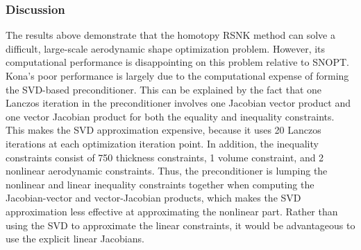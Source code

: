 \subsubsection{Discussion}
The results above demonstrate that the homotopy RSNK method can solve 
a difficult, large-scale aerodynamic shape optimization problem.
However, its computational performance is disappointing on this problem relative to SNOPT. 
Kona's poor performance is largely due to the computational expense of forming the SVD-based 
preconditioner. This can be explained by the fact that one Lanczos iteration in the preconditioner involves  
one Jacobian vector product and one vector Jacobian product for both the equality and inequality constraints. This makes the SVD approximation expensive, because it uses 20 Lanczos iterations at each optimization iteration point. In addition, the inequality constraints consist of 750 thickness constraints, 1 volume constraint,  and 2 nonlinear aerodynamic constraints. Thus, the preconditioner is lumping the nonlinear and linear inequality constraints together when computing the Jacobian-vector and vector-Jacobian products, which makes the SVD approximation less effective at approximating the nonlinear part.  Rather than using the SVD to approximate the linear constraints, it would be advantageous to use the explicit linear Jacobians. 



